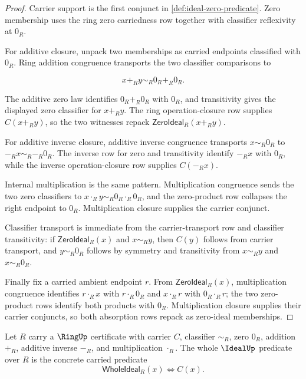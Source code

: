 \begin{proof}
Carrier support is the first conjunct in \autoref{def:ideal-zero-predicate}. Zero membership uses the ring zero carriedness row together with classifier reflexivity at $0_R$.

For additive closure, unpack two memberships as carried endpoints classified with $0_R$. Ring addition congruence transports the two classifier comparisons to

$$
x+_R y\sim_R0_R+_R0_R.
$$

The additive zero law identifies $0_R+_R0_R$ with $0_R$, and transitivity gives the displayed zero classifier for $x+_R y$. The ring operation-closure row supplies $C(x+_R y)$, so the two witnesses repack $\mathsf{ZeroIdeal}_R(x+_R y)$.

For additive inverse closure, additive inverse congruence transports $x\sim_R0_R$ to $-_R x\sim_R-_R0_R$. The inverse row for zero and transitivity identify $-_R x$ with $0_R$, while the inverse operation-closure row supplies $C(-_R x)$.

Internal multiplication is the same pattern. Multiplication congruence sends the two zero classifiers to $x\cdot_R y\sim_R0_R\cdot_R0_R$, and the zero-product row collapses the right endpoint to $0_R$. Multiplication closure supplies the carrier conjunct.

Classifier transport is immediate from the carrier-transport row and classifier transitivity: if $\mathsf{ZeroIdeal}_R(x)$ and $x\sim_Ry$, then $C(y)$ follows from carrier transport, and $y\sim_R0_R$ follows by symmetry and transitivity from $x\sim_Ry$ and $x\sim_R0_R$.

Finally fix a carried ambient endpoint $r$. From $\mathsf{ZeroIdeal}_R(x)$, multiplication congruence identifies $r\cdot_Rx$ with $r\cdot_R0_R$ and $x\cdot_Rr$ with $0_R\cdot_Rr$; the two zero-product rows identify both products with $0_R$. Multiplication closure supplies their carrier conjuncts, so both absorption rows repack as zero-ideal memberships.
\end{proof}

\begin{definition}
\label{def:ideal-whole-predicate}
Let $R$ carry a $\RingUp$ certificate with carrier $C$, classifier $\sim_R$, zero $0_R$, addition $+_R$, additive inverse $-_R$, and multiplication $\cdot_R$. The whole $\IdealUp$ predicate over $R$ is the concrete carried predicate
$$
\mathsf{WholeIdeal}_R(x)\Longleftrightarrow C(x).
$$
\end{definition}

